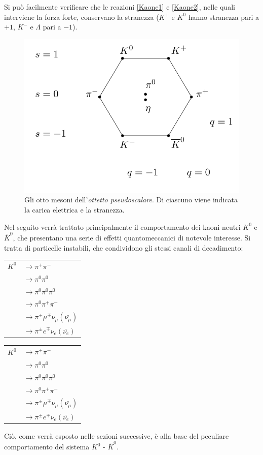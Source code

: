 Si può facilmente verificare che le reazioni \eqref{Kaone1} e \eqref{Kaone2}, nelle quali interviene la forza forte, conservano la stranezza ($K^+$ e $K^0$ hanno stranezza pari 
a $+1$, $K^-$ e $\Lambda$ pari a $-1$).
\begin{figure}
\begin{center}
\includegraphics[scale=1]{Immagini/Meson_octet}
\caption{Gli otto mesoni dell'\emph{ottetto pseudoscalare}. Di ciascuno viene indicata la carica elettrica e la stranezza.}
\end{center}
\end{figure}

Nel seguito verrà trattato principalmente il comportamento dei kaoni neutri $K^0$ e $\bar{K}^0$, che presentano una serie di effetti quantomeccanici di notevole interesse.
Si tratta di particelle instabili, che condividono gli stessi canali di decadimento:
\begin{center}
\begin{tabular}{ll}
$K^0$ & $\rightarrow \pi^+ \pi^-$\\
 & $\rightarrow \pi^0 \pi^0$\\
 & $\rightarrow \pi^0 \pi^0 \pi^0$\\
 & $\rightarrow \pi^0 \pi^+ \pi^-$\\
 & $\rightarrow \pi^{\pm} \mu^{\mp} \nu_{\mu} (\bar{\nu_{\mu}})$\\
 & $\rightarrow \pi^{\pm} e^{\mp} \nu_{e} (\bar{\nu_{e}})$
\end{tabular}
\end{center}
\begin{center}
\begin{tabular}{ll}
$\bar{K^0}$ & $\rightarrow \pi^+ \pi^-$\\
 & $\rightarrow \pi^0 \pi^0$\\
 & $\rightarrow \pi^0 \pi^0 \pi^0$\\
 & $\rightarrow \pi^0 \pi^+ \pi^-$\\
 & $\rightarrow \pi^{\pm} \mu^{\mp} \nu_{\mu} (\bar{\nu_{\mu}})$\\
 & $\rightarrow \pi^{\pm} e^{\mp} \nu_{e} (\bar{\nu_{e}})$
\end{tabular}
\end{center}
Ciò, come verrà esposto nelle sezioni successive, è alla base del peculiare comportamento del sistema $K^0$ - $\bar{K}^0$. 

